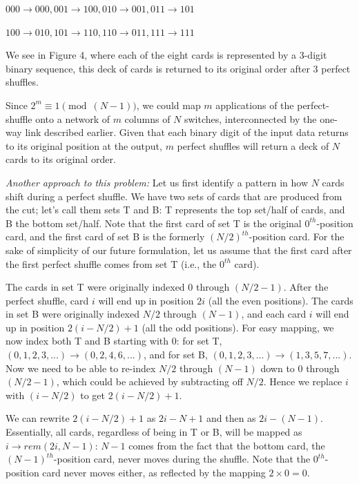 \documentclass[twoside,12pt]{article}
\begin{document}
\begin{problem}{20}
{\vspace{18pt}
\centerline{$000 \to 000,   001 \to 100,   010 \to 001,   011 \to 101$}
\centerline{$100 \to 010, 101 \to 110, 110 \to 011, 111 \to 111$}
\vspace{18pt}


We see in Figure 4, where each of the eight cards is represented by a 3-digit binary sequence, this deck of cards is returned to its original order after 3 perfect shuffles.

Since  $2^m \equiv 1 \pmod{(N-1)}$, we could map $m$ applications of the perfect-shuffle onto a network of $m$ columns of $N$ switches, interconnected by the one-way link described earlier.  Given that each binary digit of the input data returns to its original position at the output, $m$ perfect shuffles will return a deck of $N$ cards to its original order.

\emph{Another approach to this problem:} Let us first identify a pattern in how $N$ cards shift during a perfect shuffle. We have two sets of cards that are produced from the cut; let's call them sets T and B: T represents the top set/half of cards, and B the bottom set/half. Note that the first card of set T is the original $0^{th}$-position card, and the first card of set B is the formerly $(N/2)^{th}$-position card. For the sake of simplicity of our future formulation, let us assume that the first card after the first perfect shuffle comes from set T (i.e., the $0^{th}$ card).
 
The cards in set T were originally indexed 0 through $(N/2 - 1)$.  After the perfect shuffle, card $i$ will end up in position $2i$ (all the even positions). The cards in set B were originally indexed $N/2$ through $(N - 1)$, and each card $i$ will end up in position $2(i - N/2) + 1$ (all the odd positions). For easy mapping, we now index both T and B starting with 0: for set T, $(0, 1, 2, 3, ...) \to (0, 2, 4, 6, ...)$, and for set B, $(0, 1, 2, 3, ...) \to (1, 3, 5, 7, ...)$. Now we need to be able to re-index $N/2$ through $(N - 1)$ down to 0 through $(N/2 - 1)$, which could be achieved by subtracting off $N/2$. Hence we replace $i$ with $(i - N/2)$ to get $2(i - N/2) + 1$.
 
We can rewrite $2(i - N/2) + 1$ as $2i - N + 1$ and then as $2i - (N - 1)$. Essentially, all cards, regardless of being in T or B, will be mapped as $i \to rem(2i, N - 1)$: $N - 1$ comes from the fact that the bottom card, the $(N - 1)^{th}$-position card, never moves during the shuffle. Note that the $0^{th}$-position card never moves either, as reflected by the mapping $2 \times 0 = 0$.
 
}
\end{problem}
\end{document}
